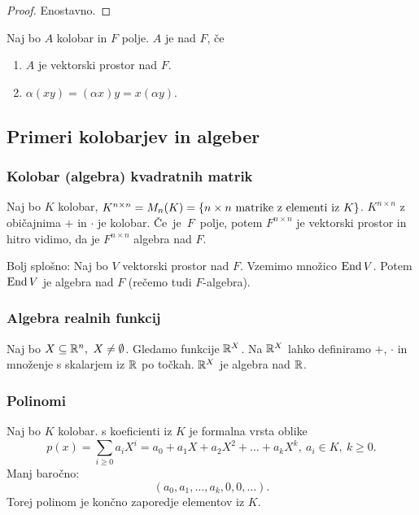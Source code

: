 \begin{proof}
    Enostavno.
\end{proof}

\begin{definicija}
    Naj bo $A$ kolobar in $F$ polje. $A$ je  nad $F$, če 
    \begin{enumerate}
        \item $A$ je vektorski prostor nad $F$.
        \item $\alpha(xy) = (\alpha x)y = x(\alpha y)$.
    \end{enumerate}
\end{definicija}

\subsection{Primeri kolobarjev in algeber}
\subsubsection*{Kolobar (algebra) kvadratnih matrik}
Naj bo $K$ kolobar, $K^{n \times n} = M_n(K) = \left\{n \times n \text{ matrike z elementi iz } K\right\}$. $K^{n \times n}$ z običajnima $+$ in $\cdot$ je kolobar. Če~je~$F$~polje, potem $F^{n \times n}$ je vektorski prostor in hitro vidimo, da je $F^{n \times n}$ algebra nad $F$.

Bolj splošno: Naj bo $V$ vektorski prostor nad $F$. Vzemimo množico $\operatorname{End} V$. Potem $\operatorname{End} V$ je algebra nad $F$ (rečemo tudi $F$-algebra).

\subsubsection*{Algebra realnih funkcij}
Naj bo $X \subseteq \mathbb{R}^n, \ X \neq \emptyset$. Gledamo funkcije $\mathbb{R}^X$. Na $\mathbb{R}^X$ lahko definiramo $+$, $\cdot$ in množenje s skalarjem iz $\mathbb{R}$ po točkah. $\mathbb{R}^X$ je algebra nad $\mathbb{R}$.

\subsubsection*{Polinomi}
Naj bo $K$ kolobar.  s koeficienti iz $K$ je formalna vrsta oblike
$$p(x) = \sum_{i \geq 0} a_iX^i = a_0 + a_1X + a_2 X^2 + \ldots + a_k X^k, \ a_i \in K, \ k \geq 0.$$
Manj baročno:
$$(a_0, a_1, \ldots, a_k, 0, 0, \ldots).$$
Torej polinom je končno zaporedje elementov iz $K$.

